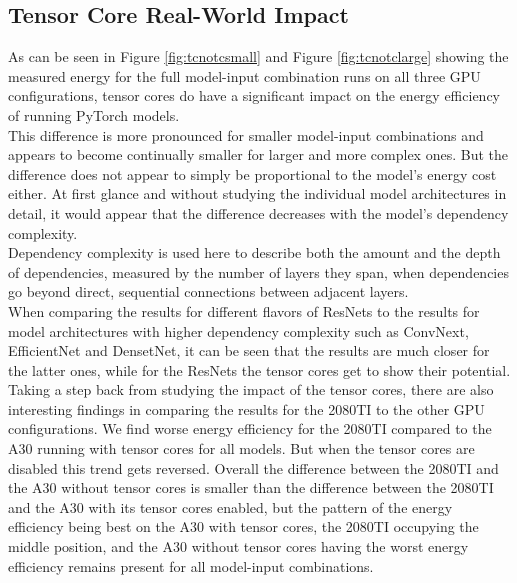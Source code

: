 \documentclass[conference]{IEEEtran}
\begin{document}
\subsection{Tensor Core Real-World Impact}
As can be seen in Figure \ref{fig:tcnotcsmall} and Figure \ref{fig:tcnotclarge} showing the measured energy for the full model-input combination runs on all three GPU configurations, tensor cores do have a significant impact on the energy efficiency of running PyTorch models. \\
This difference is more pronounced for smaller model-input combinations and appears to become continually smaller for larger and more complex ones. But the difference does not appear to simply be proportional to the model's energy cost either. At first glance and without studying the individual model architectures in detail, it would appear that the difference decreases with the model's dependency complexity. \\
Dependency complexity is used here to describe both the amount and the depth of dependencies, measured by the number of layers they span, when dependencies go beyond direct, sequential connections between adjacent layers.\\
When comparing the results for different flavors of ResNets to the results for model architectures with higher dependency complexity such as ConvNext, EfficientNet and DensetNet, it can be seen that the results are much closer for the latter ones, while for the ResNets the tensor cores get to show their potential. \\
Taking a step back from studying the impact of the tensor cores, there are also interesting findings in comparing the results for the 2080TI to the other GPU configurations. We find worse energy efficiency for the 2080TI compared to the A30 running with tensor cores for all models. But when the tensor cores are disabled this trend gets reversed. Overall the difference between the 2080TI and the A30 without tensor cores is smaller than the difference between the 2080TI and the A30 with its tensor cores enabled, but the pattern of the energy efficiency being best on the A30 with tensor cores, the 2080TI occupying the middle position, and the A30 without tensor cores having the worst energy efficiency remains present for all model-input combinations.

\end{document}
